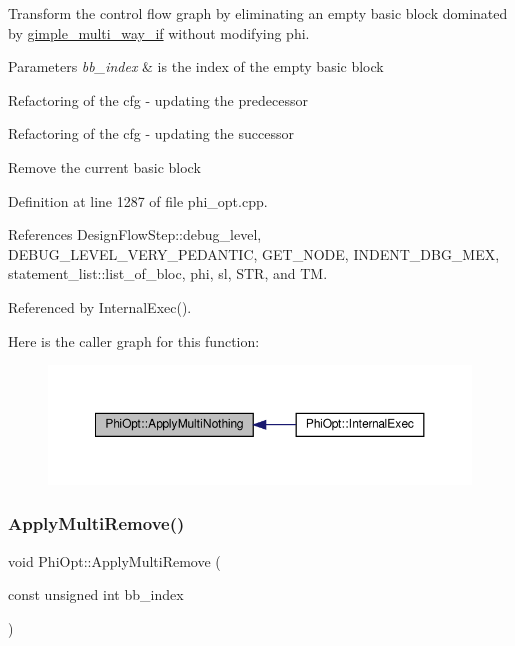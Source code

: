 Transform the control flow graph by eliminating an empty basic block dominated by \hyperlink{structgimple__multi__way__if}{gimple\+\_\+multi\+\_\+way\+\_\+if} without modifying phi. 


\begin{DoxyParams}{Parameters}
{\em bb\+\_\+index} & is the index of the empty basic block \\
\hline
\end{DoxyParams}
Refactoring of the cfg -\/ updating the predecessor

Refactoring of the cfg -\/ updating the successor

Remove the current basic block 

Definition at line 1287 of file phi\+\_\+opt.\+cpp.



References Design\+Flow\+Step\+::debug\+\_\+level, D\+E\+B\+U\+G\+\_\+\+L\+E\+V\+E\+L\+\_\+\+V\+E\+R\+Y\+\_\+\+P\+E\+D\+A\+N\+T\+IC, G\+E\+T\+\_\+\+N\+O\+DE, I\+N\+D\+E\+N\+T\+\_\+\+D\+B\+G\+\_\+\+M\+EX, statement\+\_\+list\+::list\+\_\+of\+\_\+bloc, phi, sl, S\+TR, and TM.



Referenced by Internal\+Exec().

Here is the caller graph for this function\+:
\nopagebreak
\begin{figure}[H]
\begin{center}
\leavevmode
\includegraphics[width=350pt]{dc/ddf/classPhiOpt_a7e227327f0aaa8d0714b5bf0ca4354ab_icgraph}
\end{center}
\end{figure}
\mbox{\label{classPhiOpt_a4992671043b61c9366438a2387943f73}} 
\subsubsection{\texorpdfstring{Apply\+Multi\+Remove()}{ApplyMultiRemove()}}
{\footnotesize\ttfamily void Phi\+Opt\+::\+Apply\+Multi\+Remove (\begin{DoxyParamCaption}\item[{const unsigned int}]{bb\+\_\+index }\end{DoxyParamCaption})\hspace{0.3cm}{\ttfamily [private]}}




